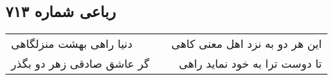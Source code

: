 \begin{center}
\section*{رباعی شماره ۷۱۳}
\label{sec:sh713}
\begin{longtable}{l p{0.5cm} r}
دنیا راهی بهشت منزلگاهی
&&
این هر دو به نزد اهل معنی کاهی
\\
گر عاشق صادقی زهر دو بگذر
&&
تا دوست ترا به خود نماید راهی
\\
\end{longtable}
\end{center}
